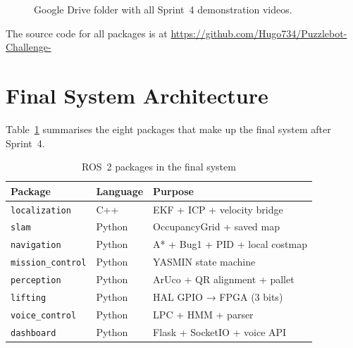 \documentclass[conference]{IEEEtran}
\begin{document}
\begin{figure}[htbp]
  \centering
  \caption{Google Drive folder with all Sprint~4 demonstration videos.}
  \label{fig:all_videos}
\end{figure}

The source code for all packages is at
\url{https://github.com/Hugo734/Puzzlebot-Challenge-}

\section{Final System Architecture}

Table~\ref{tab:packages} summarises the eight packages that make up the
final system after Sprint~4.

\begin{table}[h]
\caption{ROS~2 packages in the final system}
\label{tab:packages}
\renewcommand{\arraystretch}{1.2}
\centering
\begin{tabular}{>{\raggedright}p{2.2cm}
                >{\centering}p{1.1cm}
                >{\raggedright\arraybackslash}p{4.0cm}}
\toprule
\textbf{Package} & \textbf{Language} & \textbf{Purpose} \\
\midrule
\texttt{localization}    & C++    & EKF + ICP + velocity bridge \\
\texttt{slam}            & Python & OccupancyGrid + saved map \\
\texttt{navigation}      & Python & A* + Bug1 + PID + local costmap \\
\texttt{mission\_control} & Python & YASMIN state machine \\
\texttt{perception}      & Python & ArUco + QR alignment + pallet \\
\texttt{lifting}         & Python & HAL GPIO → FPGA (3 bits) \\
\texttt{voice\_control}  & Python & LPC + HMM + parser \\
\texttt{dashboard}       & Python & Flask + SocketIO + voice API \\
\bottomrule
\end{tabular}
\end{table}
\end{document}
